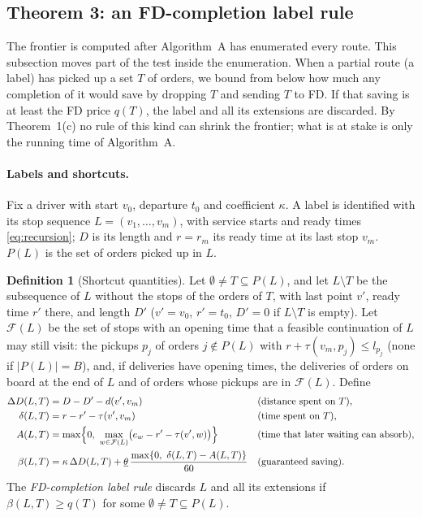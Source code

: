 \documentclass[11pt]{article}
\theoremstyle{definition}
\newtheorem{definition}{Definition}
\theoremstyle{remark}
\newcommand{\thl}{\underline{\theta}}
\begin{document}
\subsection{Theorem 3: an FD-completion label rule}
\label{sec:label}

The frontier is computed after Algorithm~A has enumerated every route. This
subsection moves part of the test inside the enumeration. When a partial route
(a label) has picked up a set $T$ of orders, we bound from below how much any
completion of it would save by dropping $T$ and sending $T$ to FD. If that
saving is at least the FD price $q(T)$, the label and all its extensions are
discarded. By Theorem~1(c) no rule of this kind can shrink the frontier; what
is at stake is only the running time of Algorithm~A.

\paragraph{Labels and shortcuts.} Fix a driver with start $v_0$, departure
$t_0$ and coefficient $\kappa$. A label is identified with its stop sequence
$L=(v_1,\dots,v_m)$, with service starts and ready times \eqref{eq:recursion};
$D$ is its length and $r=r_m$ its ready time at its last stop $v_m$. $P(L)$ is
the set of orders picked up in $L$.

\begin{definition}[Shortcut quantities]\label{def:shortcut}
Let $\emptyset\ne T\subseteq P(L)$, and let $L\setminus T$ be the subsequence
of $L$ without the stops of the orders of $T$, with last point $v'$, ready time
$r'$ there, and length $D'$ ($v'=v_0$, $r'=t_0$, $D'=0$ if $L\setminus T$ is
empty). Let $\mathcal F(L)$ be the set of stops with an opening time that a
feasible continuation of $L$ may still visit: the pickups $p_j$ of orders
$j\notin P(L)$ with $r+\tau(v_m,p_j)\le l_{p_j}$ (none if $|P(L)|=B$), and, if
deliveries have opening times, the deliveries of orders on board at the end of
$L$ and of orders whose pickups are in $\mathcal F(L)$. Define
\begin{align*}
\Delta D(L,T)&=D-D'-d(v',v_m) &&\text{(distance spent on $T$)},\\
\delta(L,T)&=r-r'-\tau(v',v_m) &&\text{(time spent on $T$)},\\
A(L,T)&=\max\Bigl\{0,\ \max_{w\in\mathcal F(L)}\bigl(e_w-r'-\tau(v',w)\bigr)\Bigr\}
&&\text{(time that later waiting can absorb)},\\
\beta(L,T)&=\kappa\,\Delta D(L,T)+\thl\,\frac{\max\{0,\ \delta(L,T)-A(L,T)\}}{60}
&&\text{(guaranteed saving)}.
\end{align*}
The \emph{FD-completion label rule} discards $L$ and all its extensions if
$\beta(L,T)\ge q(T)$ for some $\emptyset\ne T\subseteq P(L)$.
\end{definition}
\end{document}
